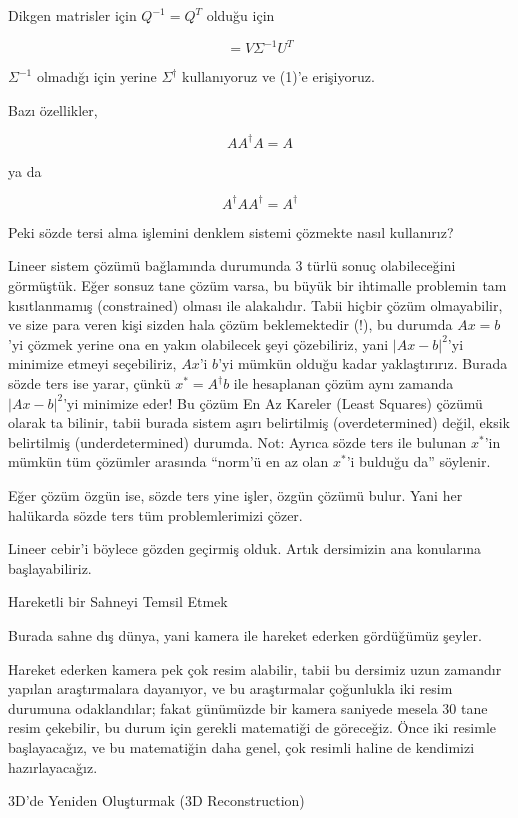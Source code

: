\documentclass[12pt,fleqn]{article}\usepackage{../../common}
\begin{document}
Dikgen matrisler için $Q^{-1}=Q^T$ olduğu için 

$$ = V\Sigma^{-1}U^{T} $$

$\Sigma^{-1}$ olmadığı için yerine $\Sigma^{\dagger}$ kullanıyoruz ve (1)'e erişiyoruz.  

Bazı özellikler,

$$ A A^{\dagger} A = A $$

ya da

$$ A^{\dagger} A  A^{\dagger} =  A^{\dagger} $$

Peki sözde tersi alma işlemini denklem sistemi çözmekte nasıl kullanırız? 

Lineer sistem çözümü bağlamında durumunda 3 türlü sonuç olabileceğini
görmüştük. Eğer sonsuz tane çözüm varsa, bu büyük bir ihtimalle problemin
tam kısıtlanmamış (constrained) olması ile alakalıdır. Tabii hiçbir çözüm
olmayabilir, ve size para veren kişi sizden hala çözüm beklemektedir (!),
bu durumda $Ax=b$'yi çözmek yerine ona en yakın olabilecek şeyi
çözebiliriz, yani $|Ax - b|^2$'yi minimize etmeyi seçebiliriz, $Ax$'i
$b$'yi mümkün olduğu kadar yaklaştırırız. Burada sözde ters ise yarar,
çünkü $x^\ast = A^{\dagger}b$ ile hesaplanan çözüm aynı zamanda $|Ax - b|^2$'yi
minimize eder! Bu çözüm En Az Kareler (Least Squares) çözümü olarak ta
bilinir, tabii burada sistem aşırı belirtilmiş (overdetermined) değil,
eksik belirtilmiş (underdetermined) durumda. Not: Ayrıca sözde ters ile
bulunan $x^\ast$'in mümkün tüm çözümler arasında ``norm'ü en az olan $x^\ast$'i
bulduğu da'' söylenir.

Eğer çözüm özgün ise, sözde ters yine işler, özgün çözümü bulur. Yani her
halükarda sözde ters tüm problemlerimizi çözer.

Lineer cebir'i böylece gözden geçirmiş olduk. Artık dersimizin ana
konularına başlayabiliriz. 

Hareketli bir Sahneyi Temsil Etmek

Burada sahne dış dünya, yani kamera ile hareket ederken gördüğümüz şeyler. 

Hareket ederken kamera pek çok resim alabilir, tabii bu dersimiz uzun
zamandır yapılan araştırmalara dayanıyor, ve bu araştırmalar çoğunlukla iki
resim durumuna odaklandılar; fakat günümüzde bir kamera saniyede mesela 30
tane resim çekebilir, bu durum için gerekli matematiği de göreceğiz. Önce
iki resimle başlayacağız, ve bu matematiğin daha genel, çok resimli haline
de kendimizi hazırlayacağız. 

3D'de Yeniden Oluşturmak (3D Reconstruction)
\end{document}
